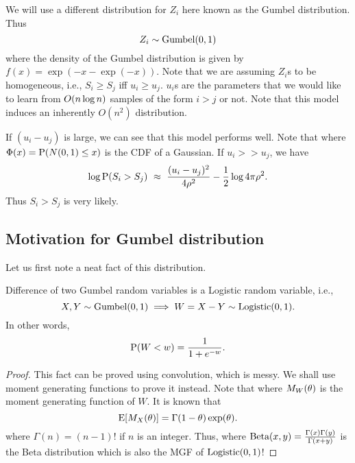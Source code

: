 \documentclass[letterpaper, 11pt, reqno]{amsart}
\begin{document}
We will use a different distribution for $Z_i$ here known as the Gumbel distribution. Thus
$$Z_i \sim \gumbel(0,1)$$
where the density of the Gumbel distribution is given by $f(x) = \exp(-x -\exp(-x))$. Note that we are assuming $Z_i$s to be homogeneous, i.e., $S_i \geq S_j$ iff $u_i \geq u_j$. $u_i$s are the parameters that we would like to learn from $\bigo(n \log n)$ samples of the form $i > j$ or not. Note that this model induces an inherently $O(n^2)$ distribution.

\begin{remark}
If $(u_i - u_j)$ is large, we can see that this model performs well. Note that
where $\Phi(x) = \P(N(0,1) \leq x)$ is the CDF of a Gaussian. If $u_i >> u_j$, we have
$$
\log \P(S_i > S_j)\ \approx\ \f{(u_i -u_j)^2}{4 \rho^2} - \f{1}{2} \log 4 \pi \rho^2.
$$
Thus $S_i > S_j$ is very likely.
\end{remark}

\subsection{Motivation for Gumbel distribution}
Let us first note a neat fact of this distribution.
\begin{lemma}
\label{lem:gumbel_mgf}
Difference of two Gumbel random variables is a Logistic random variable, i.e.,
$$
X, Y \sim \gumbel(0,1) \implies W = X-Y \sim \logistic(0,1).
$$
In other words,
$$
\P(W < w) = \f{1}{1+e^{-w}}.
$$
\end{lemma}
\begin{proof}
This fact can be proved using convolution, which is messy. We shall use moment generating functions to prove it instead. Note that
where $M_W(\th)$ is the moment generating function of $W$. It is known that
$$
\E[M_X(\th)] = \Gamma(1-\th) \exp(\th).
$$
where $\Gamma(n) = (n-1)!$ if $n$ is an integer.
Thus,
where $\trm{Beta}(x,y) = \f{\Gamma(x) \Gamma(y)}{\Gamma(x+y)}$ is the Beta distribution which is also the MGF of $\logistic(0,1)$!
\end{proof}
\end{document}

